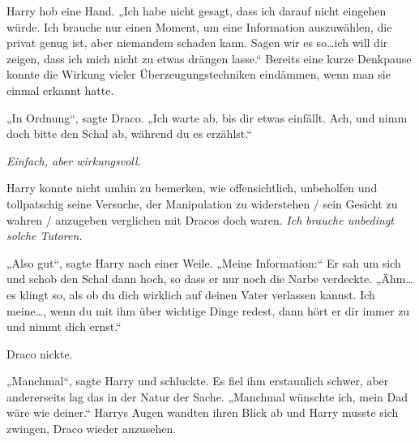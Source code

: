 Harry hob eine Hand. „Ich habe nicht gesagt, dass ich darauf nicht eingehen würde. Ich brauche nur einen Moment, um eine Information auszuwählen, die privat genug ist, aber niemandem schaden kann. Sagen wir es so…ich will dir zeigen, dass ich mich nicht zu etwas drängen lasse.“ Bereits eine kurze Denkpause konnte die Wirkung vieler Überzeugungstechniken eindämmen, wenn man sie einmal erkannt hatte.

„In Ordnung“, sagte Draco. „Ich warte ab, bis dir etwas einfällt. Ach, und nimm doch bitte den Schal ab, während du es erzählst.“

\emph{Einfach, aber wirkungsvoll.}

Harry konnte nicht umhin zu bemerken, wie offensichtlich, unbeholfen und tollpatschig seine Versuche, der Manipulation zu widerstehen / sein Gesicht zu wahren / anzugeben verglichen mit Dracos doch waren. \emph{Ich brauche unbedingt solche Tutoren.}

„Also gut“, sagte Harry nach einer Weile. „Meine Information:“ Er sah um sich und schob den Schal dann hoch, so dass er nur noch die Narbe verdeckte. „Ähm…es klingt so, als ob du dich wirklich auf deinen Vater verlassen kannst. Ich meine…, wenn du mit ihm über wichtige Dinge redest, dann hört er dir immer zu und nimmt dich ernst.“

Draco nickte.

„Manchmal“, sagte Harry und schluckte. Es fiel ihm erstaunlich schwer, aber andererseits lag das in der Natur der Sache. „Manchmal wünschte ich, mein Dad wäre wie deiner.“ Harrys Augen wandten ihren Blick ab und Harry musste sich zwingen, Draco wieder anzusehen.

